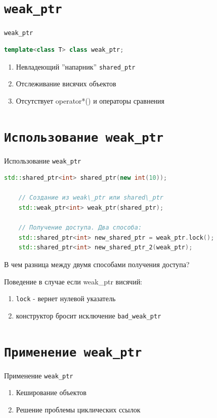\documentclass[10pt]{beamer}
\begin{document}
\section{\texttt{weak\_ptr}}
\begin{frame}[fragile]{\texttt{weak\_ptr}}
\begin{lstlisting}[language=C++]
    template<class T> class weak_ptr;
\end{lstlisting}

\begin{enumerate}
    \item Невладеющий ''напарник'' \texttt{shared\_ptr}
    \item Отслеживание висячих объектов
    \item Отсутствует operator*() и операторы сравнения
\end{enumerate}

\end{frame}

\section{\texttt{Использование weak\_ptr}}
\begin{frame}[fragile]{Использование \texttt{weak\_ptr}}
\begin{lstlisting}[language=C++]
    std::shared_ptr<int> shared_ptr(new int(10));

    // Создание из weak\_ptr или shared\_ptr
    std::weak_ptr<int> weak_ptr(shared_ptr);

    // Получение доступа. Два способа:
    std::shared_ptr<int> new_shared_ptr = weak_ptr.lock();
    std::shared_ptr<int> new_shared_ptr_2(weak_ptr);

\end{lstlisting}

В чем разница между двумя способами получения доступа?

\pause
Поведение в случае если weak\_ptr висячий:
\begin{enumerate}
    \item \texttt{lock} - вернет нулевой указатель
    \item конструктор бросит исключение \texttt{bad\_weak\_ptr}
\end{enumerate}
\end{frame}

\section{\texttt{Применение weak\_ptr}}
\begin{frame}[fragile]{Применение \texttt{weak\_ptr}}
\begin{enumerate}
    \item Кеширование объектов
    \item Решение проблемы циклических ссылок
\end{enumerate}
\end{frame}
\end{document}
